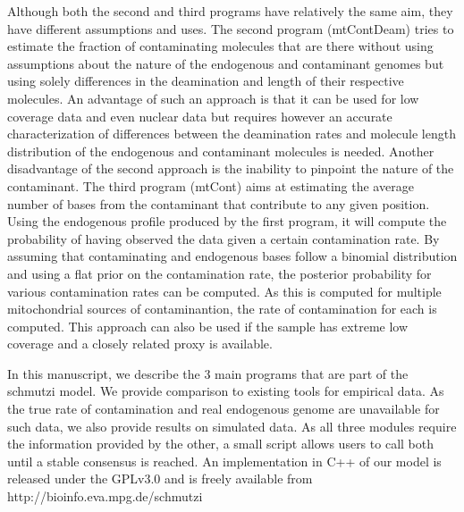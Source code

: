 \documentclass[a4paper,12pt]{article}
\begin{document}
Although both the second and third programs have relatively the same aim, they have different assumptions and uses. The second program (mtContDeam) tries to estimate the fraction of contaminating molecules that are there without using assumptions about the nature of the endogenous and contaminant genomes but using solely differences in the deamination and length of their respective molecules. An advantage of such an approach is that it can be used for low coverage data and even nuclear data but requires however an accurate characterization of differences between the deamination rates and molecule length distribution of the endogenous and contaminant molecules is needed. Another disadvantage of the second approach is the inability to pinpoint the nature of the contaminant.  The third program (mtCont) aims at estimating the average number of bases from the contaminant that contribute to any given position. Using the endogenous profile produced by the first program, it will compute the probability of having observed the data given a certain contamination rate. By assuming that contaminating and endogenous bases follow a binomial distribution and using a flat prior on the contamination rate, the posterior probability for various contamination rates can be computed. As this is computed for multiple mitochondrial sources of contaminantion, the rate of contamination for each is computed. This approach can also be used if the sample has extreme low coverage and a closely related proxy is available. 


In this manuscript, we describe the 3 main programs that are part of the schmutzi model. We provide comparison to existing tools for empirical data. As the true rate of contamination and real endogenous genome are unavailable for such data, we also provide results on simulated data. As all three modules require the information provided by the other, a small script allows users to call both until a stable consensus is reached. An implementation in C++ of our model is released under the GPLv3.0 and is freely available from http://bioinfo.eva.mpg.de/schmutzi







\end{document}
